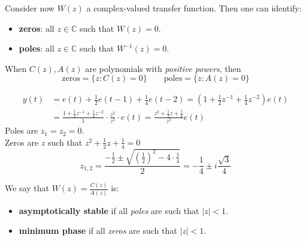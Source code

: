 Consider now $W(z)$ a complex-valued transfer function. Then one can identify:
\begin{itemize}
	\item \textbf{zeros}: all $z\in \mathbb{C}$ such that $W(z)=0$.
	\item \textbf{poles}: all $z\in \mathbb{C}$ such that $W^{-1} (z)=0$.
\end{itemize}
When $C(z),A(z)$ are polynomials with \emph{positive powers}, then
\[
	\text{zeros}=\{z:C(z)=0\} \qquad \text{poles}=\{z:A(z)=0\}
\]
\begin{example}
\begin{align*}
y(t) &=e(t)+\frac{1}{2} e(t-1)+\frac{1}{4} e(t-2) =\left(1+\frac{1}{2} z^{-1}+\frac{1}{4} z^{-2}\right) e(t) \\
&=\frac{1+\frac{1}{2} z^{-1}+\frac{1}{4} z^{-2}}{1} \cdot \frac{z^{2}}{z^{2}}\cdot e(t) =\frac{z^{2}+\frac{1}{2} z+\frac{1}{4}}{z^{2}} e(t)
\end{align*}
Poles are $z_{1}=z_{2}=0$.\\
Zeros are $z$ such that $z^{2}+\frac{1}{2} z+\frac{1}{4}=0$
\[
	z_{1,2}=\frac{-\frac{1}{2} \pm \sqrt{\left( \frac{1}{2}  \right) ^2 -4\cdot\frac{1}{4} } }{2} = -\frac{1}{4}\pm i\frac{\sqrt{3} }{4}
\]
\end{example}
\begin{figure}[htpb]
	\centering
\end{figure}
\FloatBarrier

\begin{definition}
	We say that $W(z)=\frac{C(z)}{A(z)}$ is:
	\begin{itemize}
		\item \textbf{asymptotically stable} if all \emph{poles} are such that $|z|<1$.
		\item \textbf{minimum phase} if all \emph{zeros} are such that $|z|<1$.
	\end{itemize}
\end{definition}

